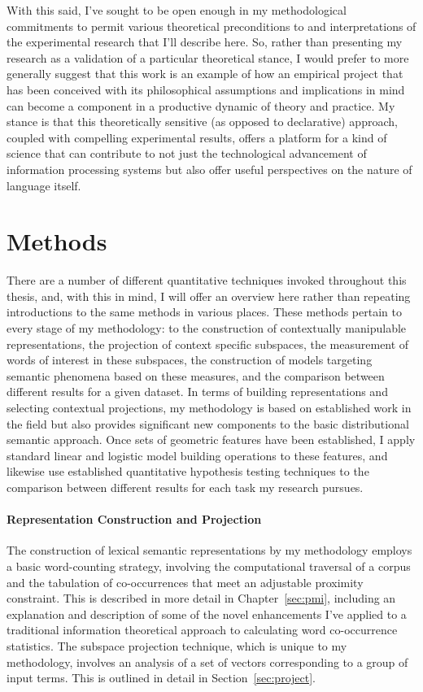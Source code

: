 With this said, I've sought to be open enough in my methodological commitments to permit various theoretical preconditions to and interpretations of the experimental research that I'll describe here.  So, rather than presenting my research as a validation of a particular theoretical stance, I would prefer to more generally suggest that this work is an example of how an empirical project that has been conceived with its philosophical assumptions and implications in mind can become a component in a productive dynamic of theory and practice.  My stance is that this theoretically sensitive (as opposed to declarative) approach, coupled with compelling experimental results, offers a platform for a kind of science that can contribute to not just the technological advancement of information processing systems but also offer useful perspectives on the nature of language itself.

\section{Methods}
There are a number of different quantitative techniques invoked throughout this thesis, and, with this in mind, I will offer an overview here rather than repeating introductions to the same methods in various places.  These methods pertain to every stage of my methodology: to the construction of contextually manipulable representations, the projection of context specific subspaces, the measurement of words of interest in these subspaces, the construction of models targeting semantic phenomena based on these measures, and the comparison between different results for a given dataset.  In terms of building representations and selecting contextual projections, my methodology is based on established work in the field but also provides significant new components to the basic distributional semantic approach.  Once sets of geometric features have been established, I apply standard linear and logistic model building operations to these features, and likewise use established quantitative hypothesis testing techniques to the comparison between different results for each task my research pursues.

\paragraph{Representation Construction and Projection} The construction of lexical semantic representations by my methodology employs a basic word-counting strategy, involving the computational traversal of a corpus and the tabulation of co-occurrences that meet an adjustable proximity constraint.  This is described in more detail in Chapter~\ref{sec:pmi}, including an explanation and description of some of the novel enhancements I've applied to a traditional information theoretical approach to calculating word co-occurrence statistics.  The subspace projection technique, which is unique to my methodology, involves an analysis of a set of vectors corresponding to a group of input terms.  This is outlined in detail in Section~\ref{sec:project}.

